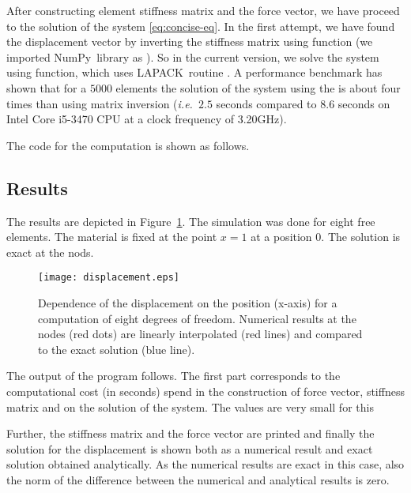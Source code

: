 \documentclass[twoside,a4paper,12pt]{article}
\newcommand{\figref}[1]{Figure~\ref{#1}}
\newcommand{\prog}[1]{\textsf{#1}}
\newcommand{\numpy}{\prog{NumPy}}
\newcommand{\lapack}{\prog{LAPACK}}
\newcommand{\ie}{{\it i.e.\ }}
\newcommand{\note}[1]{}
\begin{document}
After constructing element stiffness matrix and the force vector, we
have proceed to the solution of the system \eqref{eq:concise-eq}. In
the first attempt, we have found the displacement vector by inverting
the stiffness matrix using  function (we imported
\numpy\ library as ). So in the current version, we
solve the system using  function, which uses
\lapack\ routine . A performance benchmark has shown
that for a $5000$ elements the solution of the system using the
 is about four times than using matrix inversion
(\ie $2.5$ seconds compared to $8.6$ seconds on Intel Core i5-3470 CPU
at a clock frequency of 3.20GHz).
%
\note{it would be interesting to see what order of $N$ is the
  computational cost. It should be $\cO{N^2}$ for gaussian elimination
  and $\cO{N^3}$ for matrix inversion. }

The code for the computation is shown as follows.




\subsection{Results}

The results are depicted in \figref{fig:displacement}. The simulation
was done for eight free elements. The material is fixed at the point
$x=1$ at a position $0$. The solution is exact at the nods.

\begin{figure}
  \centering
  \texttt{[image: displacement.eps]}
  \caption{Dependence of the displacement on the position (x-axis) for
    a computation of eight degrees of freedom. Numerical results at
    the nodes (red dots) are linearly interpolated (red lines) and
    compared to the exact solution (blue line).}
  \label{fig:displacement}
\end{figure}

The output of the program follows.
%
The first part corresponds to the computational cost (in seconds)
spend in the construction of force vector, stiffness matrix and on the
solution of the system. The values are very small for this

Further, the stiffness matrix and the force vector are printed and
finally the solution for the displacement is shown both as a numerical
result and exact solution obtained analytically. As the numerical
results are exact in this case, also the norm of the difference
between the numerical and analytical results is zero.
%
\note{the result at the nodes is 0, but what about the result on the
  midpoints? Hughes seems to talk about relative error in $u_{,x}$
  what is that useful for?  How is the order of convergence?}
\end{document}
